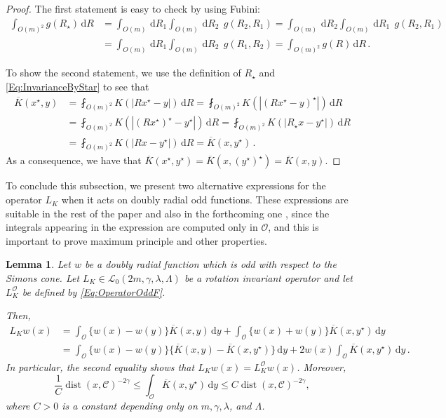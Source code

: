 \documentclass[12pt,reqno]{amsart}
\newtheorem{lemma}[theorem]{Lemma}
\theoremstyle{definition}
\theoremstyle{remark}
\newcommand{\ccal}{\mathscr{C}}
\newcommand{\lcal}{\mathcal{L}}
\newcommand{\ocal}{\mathcal{O}}
\newcommand{\s}{\gamma}
\renewcommand{\d}{\,\mathrm{d}} %
\newcommand{\average}{\fint}
\DeclareMathOperator{\dist}{dist}
\numberwithin{equation}{section}
\begin{document}
\begin{proof}
	The first statement is easy to check by using Fubini:
	\begin{align*}
	\int_{O(m)^2} g(R_\star) \d R & = \int_{O(m)} \!\! \d R_1 \int_{O(m)} \!\! \d R_2 \ \ g(R_2, R_1)  =  \int_{O(m)} \!\! \d R_2 \int_{O(m)} \!\! \d R_1 \ \ g(R_2, R_1) \\
	& =  \int_{O(m)} \!\! \d R_1 \int_{O(m)} \!\! \d R_2 \ \ g(R_1, R_2)  =  \int_{O(m)^2} g(R) \d R\,.
	\end{align*}
	
	To show the second statement, we use the definition of $R_\star$ and \eqref{Eq:InvarianceByStar}
	to see that
	\begin{align*}
	\overline{K}(x^\star,y) &= \average_{O(m)^2} K(|Rx^\star - y|) \d R = \average_{O(m)^2} K(|(Rx^\star - y)^\star|) \d R \\
	&= \average_{O(m)^2} K(|(R x^\star)^\star - y^\star|) \d R = \average_{O(m)^2} K(|R_\star x - y^\star|) \d R \\
	&= \average_{O(m)^2} K(|Rx - y^\star|) \d R = \overline{K}(x,y^\star)\,.
	\end{align*}
	As a consequence, we have that $\overline{K}(x^\star,y^\star) = \overline{K}(x,(y^\star)^\star) = \overline{K}(x,y)$.
\end{proof}

To conclude this subsection, we present two alternative expressions for the operator $L_K$ when it acts on doubly radial odd functions. These expressions are suitable in the rest of the paper and also in the forthcoming one \cite{FelipeSanz-Perela:IntegroDifferentialII}, since the integrals appearing in the expression are computed only in $\ocal$, and this is important to prove maximum principle and other properties.

\begin{lemma}
	\label{Lemma:OperatorOddF}
	Let $w$ be a doubly radial function which is odd with respect to the Simons cone. Let $L_K \in \lcal_0(2m,\s,\lambda, \Lambda)$ be a rotation invariant operator and let $L_K^\ocal$ be defined by \eqref{Eq:OperatorOddF}. 
	
	Then, 
	\begin{align*}
	L_K w (x) &= \int_{\ocal} \{w(x) - w(y) \} \overline{K}(x, y) \d y +  \int_{\ocal} \{w(x) + w(y) \} \overline{K}(x, y^\star) \d y \\
	&= \int_{\ocal} \{w(x) - w(y) \} \{\overline{K}(x, y) - \overline{K}(x, y^\star)  \} \d y +  2 w(x) \int_{\ocal} \overline{K}(x, y^\star) \d y \,.
	\end{align*}
	In particular, the second equality shows that $L_K w (x) = L_K^\ocal w(x)$. 	Moreover,
	\begin{equation}
	\label{Eq:ZeroOrderTerm}
	\dfrac{1}{C} \dist(x,\ccal)^{-2\s} \leq \int_{\ocal} \overline{K}(x, y^\star) \d y \leq C \dist(x,\ccal)^{-2\s},
	\end{equation}
	where $C>0$ is a constant depending only on $m, \s, \lambda$, and $\Lambda$.
\end{lemma}
\end{document}
